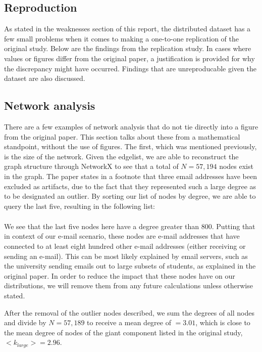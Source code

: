 \documentclass[a4paper]{article}
\begin{document}
\begin{multicols}{2}
\section{Reproduction}
\hspace*{\parindent}As stated in the weaknesses section of this report, the distributed dataset has a few small problems when it comes to making a one-to-one replication of the original study. Below are the findings from the replication study. In cases where values or figures differ from the original paper, a justification is provided for why the discrepancy might have occurred. Findings that are unreproducable given the dataset are also discussed. 

\subsection{Network analysis}
\hspace*{\parindent}There are a few examples of network analysis that do not tie directly into a figure from the original paper. This section talks about these from a mathematical standpoint, without the use of figures. The first, which was mentioned previously, is the size of the network. Given the edgelist, we are able to reconstruct the graph structure through NetworkX to see that a total of \(N = 57,194\) nodes exist in the graph. The paper states in a footnote that three email addresses have been excluded as artifacts, due to the fact that they represented such a large degree as to be designated an outlier. By sorting our list of nodes by degree, we are able to query the last five, resulting in the following list:
\begin{align*}
[('13498', 802), ('11798', 1020), ('13678', 1228), \\('11028', 4171), ('32199', 6553)]
\end{align*}

We see that the last five nodes here have a degree greater than \(800\). Putting that in context of our e-mail scenario, these nodes are e-mail addresses that have connected to at least eight hundred other e-mail addresses (either receiving or sending an e-mail). This can be most likely explained by email servers, such as the university sending emails out to large subsets of students, as explained in the original paper. In order to reduce the impact that these nodes have on our distributions, we will remove them from any future calculations unless otherwise stated.

After the removal of the outlier nodes described, we sum the degrees of all nodes and divide by \(N = 57,189\) to receive a mean degree of \(< k >=3.01\), which is close to the mean degree of nodes of the giant component listed in the original study, \(< k_{large} > = 2.96\).


\end{multicols}
\end{document}
